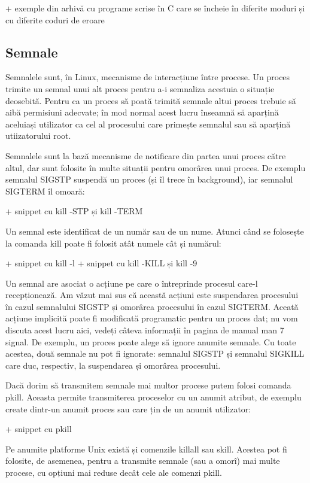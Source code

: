+  exemple din arhivă cu programe scrise în C care se încheie în diferite moduri
și cu diferite coduri de eroare

\subsection{Semnale}
\label{sec:procese-operatii-semnale}

Semnalele sunt, în Linux, mecanisme de interacțiune între procese. Un proces
trimite un semnal unui alt proces pentru a-i semnaliza acestuia o situație
deosebită. Pentru ca un proces să poată trimită semnale altui proces trebuie să
aibă permisiuni adecvate; în mod normal acest lucru înseamnă să aparțină
aceluiași utilizator ca cel al procesului care primește semnalul sau să aparțină
utiizatorului root.

Semnalele sunt la bază mecanisme de notificare din partea unui proces către
altul, dar sunt folosite în multe situații pentru omorârea unui proces. De
exemplu semnalul SIGSTP suspendă un proces (și îl trece în background), iar
semnalul SIGTERM îl omoară:

+  snippet cu kill -STP și kill -TERM

Un semnal este identificat de un număr sau de un nume. Atunci când se folosește
la comanda kill poate fi folosit atât numele cât și numărul:

+  snippet cu kill -l
+  snippet cu kill -KILL și kill -9

Un semnal are asociat o acțiune pe care o întreprinde procesul care-l
recepționează. Am văzut mai sus că această acțiuni este suspendarea procesului
în cazul semnalului SIGSTP și omorârea procesului în cazul SIGTERM. Aceată
acțiune implicită poate fi modificată programatic pentru un proces dat; nu vom
discuta acest lucru aici, vedeți câteva informații în pagina de manual man 7
signal. De exemplu, un proces poate alege să ignore anumite semnale. Cu toate
acestea, două semnale nu pot fi ignorate: semnalul SIGSTP și semnalul SIGKILL
care duc, respectiv, la suspendarea și omorârea procesului.

Dacă dorim să transmitem semnale mai multor procese putem folosi comanda pkill.
Aceasta permite transmiterea proceselor cu un anumit atribut, de exemplu create
dintr-un anumit proces sau care țin de un anumit utilizator:

+     snippet cu pkill

Pe anumite platforme Unix există și comenzile killall sau skill. Acestea pot fi
folosite, de asemenea, pentru a transmite semnale (sau a omorî) mai multe
procese, cu opțiuni mai reduse decât cele ale comenzi pkill.

